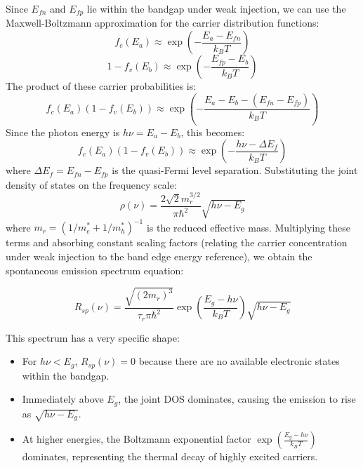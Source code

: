 Since $E_{fn}$ and $E_{fp}$ lie within the bandgap under weak injection, we can use the Maxwell-Boltzmann approximation for the carrier distribution functions:
\begin{equation*}
    f_c(E_a) \approx \exp\left(-\frac{E_a - E_{fn}}{k_B T}\right)
\end{equation*}
\begin{equation*}
    1 - f_v(E_b) \approx \exp\left(-\frac{E_{fp} - E_b}{k_B T}\right)
\end{equation*}
The product of these carrier probabilities is:
\begin{equation*}
    f_c(E_a)(1 - f_v(E_b)) \approx \exp\left(-\frac{E_a - E_b - (E_{fn} - E_{fp})}{k_B T}\right)
\end{equation*}
Since the photon energy is $h\nu = E_a - E_b$, this becomes:
\begin{equation*}
    f_c(E_a)(1 - f_v(E_b)) \approx \exp\left(-\frac{h\nu - \Delta E_f}{k_B T}\right)
\end{equation*}
where $\Delta E_f = E_{fn} - E_{fp}$ is the quasi-Fermi level separation.
Substituting the joint density of states on the frequency scale:
\begin{equation*}
    \rho(\nu) = \frac{2\sqrt{2} m_r^{3/2}}{\pi \hbar^2} \sqrt{h\nu - E_g}
\end{equation*}
where $m_r = (1/m_e^* + 1/m_h^*)^{-1}$ is the reduced effective mass. Multiplying these terms and absorbing constant scaling factors (relating the carrier concentration under weak injection to the band edge energy reference), we obtain the spontaneous emission spectrum equation:
\begin{keyresult}
    \begin{equation}
        R_{sp}(\nu) = \frac{\sqrt{(2m_r)^3}}{\tau_r \pi \hbar^2} \exp\left(\frac{E_g - h\nu}{k_B T}\right)\sqrt{h\nu - E_g}
    \end{equation}
\end{keyresult}

This spectrum has a very specific shape:
\begin{itemize}
    \item For $h\nu < E_g$, $R_{sp}(\nu) = 0$ because there are no available electronic states within the bandgap.
    \item Immediately above $E_g$, the joint DOS dominates, causing the emission to rise as $\sqrt{h\nu - E_g}$.
    \item At higher energies, the Boltzmann exponential factor $\exp\left(\frac{E_g - h\nu}{k_B T}\right)$ dominates, representing the thermal decay of highly excited carriers.
\end{itemize}

